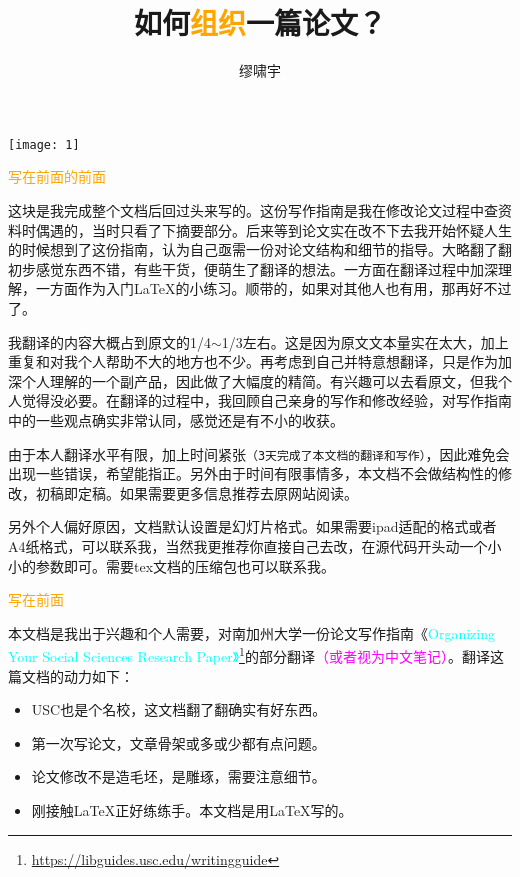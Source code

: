 \documentclass[cn,hazy,blue,14pt,screen]{elegantnote} %
\title{如何\textcolor{orange}{组织}一篇论文？}
\author{缪啸宇}
\institute{南航经管}
\date{\zhtoday}
\begin{document}
\maketitle

\centerline{
  \texttt{[image: 1]}}

\newpage

\textcolor{orange}{\Large{写在前面的前面}}

这块是我完成整个文档后回过头来写的。这份写作指南是我在修改论文过程中查资料时偶遇的，当时只看了下摘要部分。后来等到论文实在改不下去我开始怀疑人生的时候想到了这份指南，认为自己亟需一份对论文结构和细节的指导。大略翻了翻初步感觉东西不错，有些干货，便萌生了翻译的想法。一方面在翻译过程中加深理解，一方面作为入门\LaTeX{}的小练习。顺带的，如果对其他人也有用，那再好不过了。

我翻译的内容大概占到原文的1/4$\sim$1/3左右。这是因为原文文本量实在太大，加上重复和对我个人帮助不大的地方也不少。再考虑到自己并特意想翻译，只是作为加深个人理解的一个副产品，因此做了大幅度的精简。有兴趣可以去看原文，但我个人觉得没必要。在翻译的过程中，我回顾自己亲身的写作和修改经验，对写作指南中的一些观点确实非常认同，感觉还是有不小的收获。

由于本人翻译水平有限，加上时间紧张\lstinline{（3天完成了本文档的翻译和写作）}，因此难免会出现一些错误，希望能指正。另外由于时间有限事情多，本文档不会做结构性的修改，初稿即定稿。如果需要更多信息推荐去原网站阅读。

另外个人偏好原因，文档默认设置是幻灯片格式。如果需要ipad适配的格式或者A4纸格式，可以联系我，当然我更推荐你直接自己去改，在源代码开头动一个小小的参数即可。需要tex文档的压缩包也可以联系我。

\newpage

\textcolor{orange}{\Large{写在前面}}

本文档是我出于兴趣和个人需要，对南加州大学一份论文写作指南《\textcolor{cyan}{Organizing Your Social Sciences Research Paper》}\footnote{\href{https://libguides.usc.edu/writingguide}{https://libguides.usc.edu/writingguide}}的部分翻译\textcolor{magenta}{\footnotesize{（或者视为中文笔记）}}。翻译这篇文档的动力如下：

\begin{itemize}
    \item USC也是个名校，这文档翻了翻确实有好东西。
    \item 第一次写论文，文章骨架或多或少都有点问题。
    \item 论文修改不是造毛坯，是雕琢，需要注意细节。
    \item 刚接触\LaTeX{}正好练练手。本文档是用\LaTeX{}写的。
\end{itemize}
\end{document}
